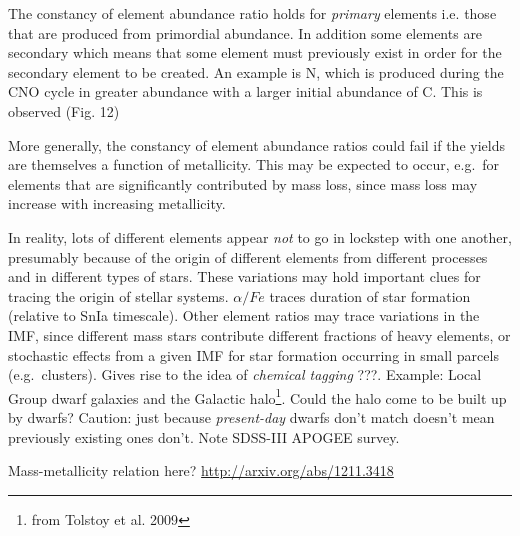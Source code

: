 \documentclass{article}
\newcommand{\mynotes}[1]{\textcolor{cadmiumorange}{#1}}
\begin{document}
The constancy of element abundance ratio holds for \emph{primary}
elements i.e. those that are produced from primordial abundance.
In addition some elements are secondary which means that some element must
previously exist in order for the secondary element to be created.
An example is N, which is produced during the CNO cycle
in greater abundance with a larger initial abundance of C.
This is observed (Fig. 12)

More generally, the constancy of element abundance ratios could fail if
the yields are themselves a function of metallicity. This may be
expected to occur, e.g.\ for elements that are significantly contributed by mass
loss, since mass loss may increase with increasing metallicity.

In reality, lots of different elements appear \emph{not} to go
in lockstep with one another, presumably because of the origin of different
elements from different processes and in different types of stars.
These variations may hold important clues for tracing the origin of stellar
systems. $\alpha/Fe$ traces duration of star formation (relative to
SnIa timescale). Other element ratios may trace variations in the IMF,
since different mass stars contribute different fractions of heavy
elements, or stochastic effects from a given IMF for star formation occurring
in small parcels (e.g.\ clusters). Gives rise to the idea of
\textit{chemical tagging} \mynotes{???}. Example: Local Group
dwarf galaxies and the Galactic halo\footnote{from Tolstoy et al. 2009}.
Could the halo come to be built up by dwarfs? Caution: just because
\emph{present-day} dwarfs don't match doesn't mean previously existing
ones don't. Note SDSS-III APOGEE survey.

Mass-metallicity relation here? \url{http://arxiv.org/abs/1211.3418}
\end{document}
